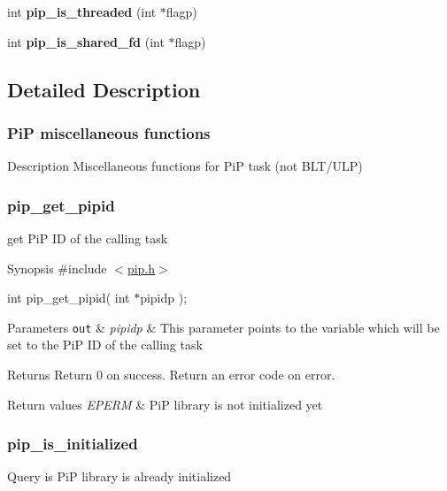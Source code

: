 \begin{DoxyCompactItemize}
\item 
\hypertarget{group__pip-5-misc_ga0455093d5040ae45585cc88a5f3f002b}{int {\bfseries pip\-\_\-is\-\_\-threaded} (int $\ast$flagp)}\label{group__pip-5-misc_ga0455093d5040ae45585cc88a5f3f002b}

\item 
\hypertarget{group__pip-5-misc_ga180ece8f3f537d84db8e70921f3ae099}{int {\bfseries pip\-\_\-is\-\_\-shared\-\_\-fd} (int $\ast$flagp)}\label{group__pip-5-misc_ga180ece8f3f537d84db8e70921f3ae099}

\end{DoxyCompactItemize}


\subsection{Detailed Description}
\hypertarget{pip-misc}{}\subsubsection{Pi\-P miscellaneous functions}\label{pip-misc}
\begin{DoxyParagraph}{Description}
Miscellaneous functions for Pi\-P task (not B\-L\-T/\-U\-L\-P) 
\end{DoxyParagraph}
\hypertarget{pip_get_pipid}{}\subsubsection{pip\-\_\-get\-\_\-pipid}\label{pip_get_pipid}
get Pi\-P I\-D of the calling task

\begin{DoxyParagraph}{Synopsis}
\#include $<$\hyperlink{pip_8h_source}{pip.\-h}$>$ \par
 int pip\-\_\-get\-\_\-pipid( int $\ast$pipidp );
\end{DoxyParagraph}

\begin{DoxyParams}[1]{Parameters}
\mbox{\tt out}  & {\em pipidp} & This parameter points to the variable which will be set to the Pi\-P I\-D of the calling task\\
\hline
\end{DoxyParams}
\begin{DoxyReturn}{Returns}
Return 0 on success. Return an error code on error. 
\end{DoxyReturn}

\begin{DoxyRetVals}{Return values}
{\em E\-P\-E\-R\-M} & Pi\-P library is not initialized yet \\
\hline
\end{DoxyRetVals}
\hypertarget{pip_is_initialized}{}\subsubsection{pip\-\_\-is\-\_\-initialized}\label{pip_is_initialized}
Query is Pi\-P library is already initialized

